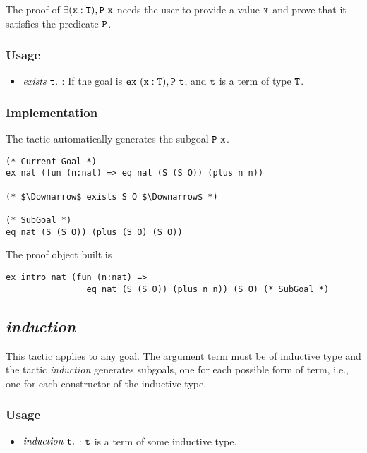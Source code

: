 The proof of $\tt\exists (x:T), P\ x$ needs the user to provide a value $\tt x$
and prove that it satisfies the predicate $\tt P$.

\subsubsection*{Usage}
\begin{itemize}
\item ${\it exists}\ \tt t.$ : If the goal is $\tt ex\ (x:T),P\ t$, and $\tt t$ is a term of type $\tt T$. 
\end{itemize}

\subsubsection*{Implementation}
The tactic automatically generates the subgoal $\tt P\ x$.
\begin{center}
\begin{minipage}{0.7\textwidth}
\begin{verbatim}
(* Current Goal *)                                                           
ex nat (fun (n:nat) => eq nat (S (S O)) (plus n n))

(* $\Downarrow$ exists S O $\Downarrow$ *)

(* SubGoal *)
eq nat (S (S O)) (plus (S O) (S O))
\end{verbatim}
\end{minipage}
\end{center}

The proof object built is
\begin{center}
\begin{minipage}{0.8\textwidth}
\begin{verbatim}
ex_intro nat (fun (n:nat) => 
                eq nat (S (S O)) (plus n n)) (S O) (* SubGoal *)
\end{verbatim}
\end{minipage}
\end{center}

\subsection{\it induction}

This tactic applies to any goal. 
The argument term must be of inductive type and the tactic {\it induction} generates subgoals, 
one for each possible form of term, i.e., one for each constructor of the inductive type.

\subsubsection*{Usage}
\begin{itemize}
\item ${\it induction}\ \tt t.$ : $\tt t$ is a term of some inductive type.
\end{itemize}

